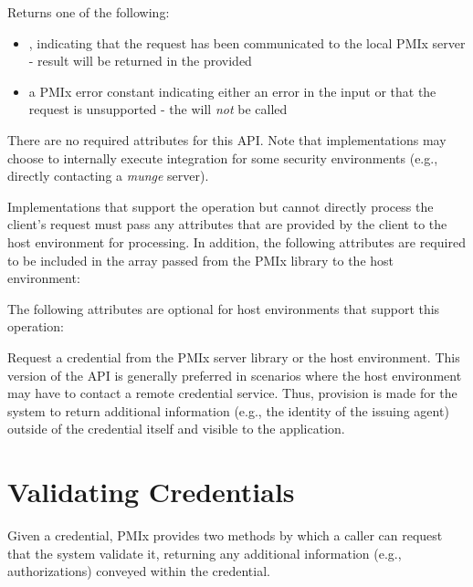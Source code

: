 Returns one of the following:

\begin{itemize}
    \item {}, indicating that the request has been communicated to the local \ac{PMIx} server - result will be returned in the provided 
    \item a \ac{PMIx} error constant indicating either an error in the input or that the request is unsupported - the  will \textit{not} be called
\end{itemize}

\reqattrstart
There are no required attributes for this \ac{API}. Note that implementations may choose to internally
execute integration for some security environments (e.g., directly
contacting a \textit{munge} server).

Implementations that support the operation but cannot directly process the client's request must pass any attributes that are provided by the client to the host environment for processing. In addition, the following attributes are required to be included in the  array passed from the \ac{PMIx} library to the host environment:


\reqattrend

\optattrstart
The following attributes are optional for host environments that support this operation:


\optattrend

\descr

Request a credential from the \ac{PMIx} server library or the host environment.  This version of the \ac{API} is generally preferred in scenarios where the host environment may have to contact a remote credential service. Thus, provision is made for the system to return additional information (e.g., the identity of the issuing agent) outside of the credential itself and visible to the application.

\section{Validating Credentials}
\label{chap:api_security:validate}

Given a credential, \ac{PMIx} provides two methods by which a caller can request that the system validate it, returning any additional information (e.g., authorizations) conveyed within the credential.

